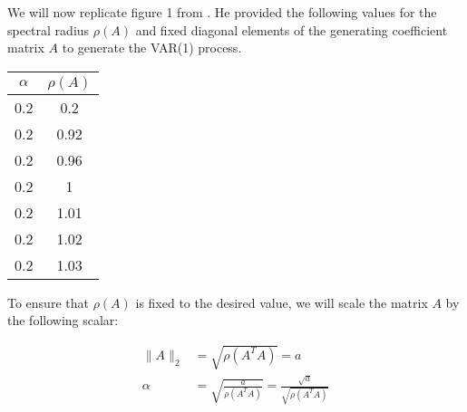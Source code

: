 \documentclass[
]{article}
\begin{document}
We will now replicate figure 1 from \cite{basu2015regularized}. He
provided the following values for the spectral radius \(\rho(A)\) and
fixed diagonal elements of the generating coefficient matrix \(A\) to
generate the VAR(1) process.

\begin{table}[h!]
\centering
\begin{tabular}{c|c}
$\alpha$ & $\rho(A)$ \\
\hline
0.2 & 0.2 \\
0.2 & 0.92 \\
0.2 & 0.96 \\
0.2 & 1 \\
0.2 & 1.01 \\
0.2 & 1.02 \\
0.2 & 1.03 \\
\end{tabular}
\end{table}

To ensure that \(\rho(A)\) is fixed to the desired value, we will scale
the matrix \(A\) by the following scalar:

\begin{align*}
\|A\|_2 &= \sqrt{\rho(A^T A)} = a \\
\alpha &= \sqrt{\frac{a}{\rho(A^T A)}} = \frac{\sqrt{a}}{\sqrt{\rho(A^T A)}}
\end{align*}
\end{document}
